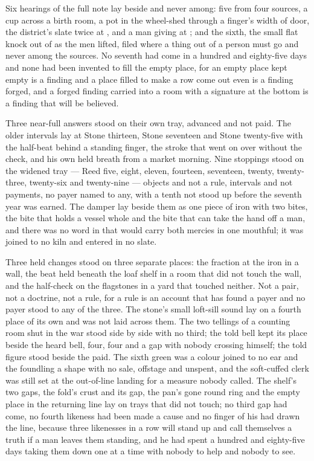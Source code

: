 Six hearings of the full note lay beside and never among: five from four sources, a cup across a birth room, a pot in the wheel-shed through a finger's width of door, the district's slate twice at , and a man giving at ; and the sixth, the small flat knock out of  as the men lifted, filed where a thing out of a person must go and never among the sources. No seventh had come in a hundred and eighty-five days and none had been invented to fill the empty place, for an empty place kept empty is a finding and a place filled to make a row come out even is a finding forged, and a forged finding carried into a room with a signature at the bottom is a finding that will be believed.

Three near-full answers stood on their own tray, advanced and not paid. The older intervals lay at Stone thirteen, Stone seventeen and Stone twenty-five with the half-beat behind a standing finger, the stroke that went on over  without the check, and his own held breath from a market morning. Nine stoppings stood on the widened tray --- Reed five, eight, eleven, fourteen, seventeen, twenty, twenty-three, twenty-six and twenty-nine --- objects and not a rule, intervals and not payments, no payer named to any, with a tenth not stood up before the seventh year was earned. The damper lay beside them as one piece of iron with two bites, the bite that holds a vessel whole and the bite that can take the hand off a man, and there was no word in  that would carry both mercies in one mouthful; it was joined to no kiln and entered in no slate.

Three held changes stood on three separate places: the fraction at the iron in a wall, the beat held beneath the loaf shelf in a room that did not touch the wall, and the half-check on the flagstones in a yard that touched neither. Not a pair, not a doctrine, not a rule, for a rule is an account that has found a payer and no payer stood to any of the three. The stone's small loft-sill sound lay on a fourth place of its own and was not laid across them. The two tellings of a counting room shut in the war stood side by side with no third; the told bell kept its place beside the heard bell, four, four and a gap with nobody crossing himself; the told figure stood beside the paid. The sixth green was a colour joined to no ear and the foundling a shape with no sale, offstage and unspent, and the soft-cuffed clerk was still set at the out-of-line landing for a measure nobody called. The shelf's two gaps, the fold's crust and its gap, the pan's gone round ring and the empty place in the returning line lay on trays that did not touch; no third gap had come, no fourth likeness had been made a cause and no finger of his had drawn the line, because three likenesses in a row will stand up and call themselves a truth if a man leaves them standing, and he had spent a hundred and eighty-five days taking them down one at a time with nobody to help and nobody to see.

